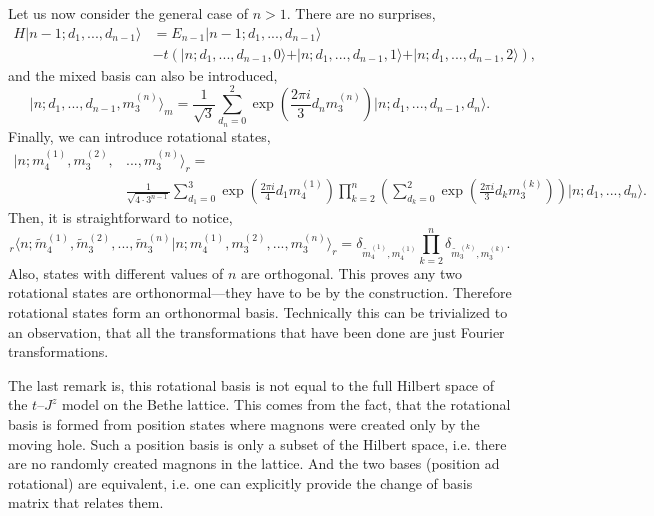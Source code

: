 \documentclass[11pt, a4paper, onecolumn]{article}
\newcommand{\ket}[1]{\vert #1 \rangle}
\newcommand{\mean}[1]{\langle#1\rangle}
\begin{document}
Let us now consider the general case of $n>1$. There are no surprises,
\begin{equation}
\begin{aligned}
	H\ket{n-1;d_1,...,d_{n-1}} &= E_{n-1} \ket{n-1;d_1,...,d_{n-1}} \\
	&- t(\ket{n;d_1,...,d_{n-1},0}+\ket{n;d_1,...,d_{n-1},1}+\ket{n;d_1,...,d_{n-1},2}),
\end{aligned}
\end{equation}
and the mixed basis can also be introduced,
\begin{equation}
	\ket{n;d_1,...,d_{n-1},m^{(n)}_3}_m = \frac{1}{\sqrt{3}}\sum_{d_n=0}^2 \exp\left(\frac{2 \pi i}{3}d_n m^{(n)}_3\right)\ket{n;d_1,...,d_{n-1},d_n}.
\end{equation}
Finally, we can introduce rotational states,
\begin{equation}
\begin{aligned}
	\ket{n;m^{(1)}_4,m^{(2)}_3,&...,m^{(n)}_3}_r = \\
	&\frac{1}{\sqrt{4 \cdot 3^{n-1}}} \sum_{d_1=0}^3 \exp\left(\frac{2 \pi i}{4}d_1 m^{(1)}_4\right) \prod_{k=2}^n \left( \sum_{d_k=0}^2  \exp\left(\frac{2 \pi i}{3}d_k m^{(k)}_3\right) \right) \ket{n;d_1,...,d_n}.
\end{aligned}
\end{equation}
Then, it is straightforward to notice,
\begin{equation}
	_r\mean{
		n;\tilde{m}^{(1)}_4,\tilde{m}^{(2)}_3,...,\tilde{m}^{(n)}_3 
		\vert 
		n;m^{(1)}_4,m^{(2)}_3,...,m^{(n)}_3
	}_r = \delta_{\tilde{m}^{(1)}_4,m^{(1)}_4} \prod_{k=2}^{n} \delta_{\tilde{m}^{(k)}_3,m^{(k)}_3}.
\end{equation}
Also, states with different values of $n$ are orthogonal. This proves any two rotational states are orthonormal---they have to be by the construction. Therefore rotational states form an orthonormal basis. Technically this can be trivialized to an observation, that all the transformations that have been done are just Fourier transformations. 

The last remark is, this rotational basis is not equal to the full Hilbert space of the $t$--$J^z$ model on the Bethe lattice. This comes from the fact, that the rotational basis is formed from position states where magnons were created only by the moving hole. Such a position basis is only a subset of the Hilbert space, i.e. there are no randomly created magnons in the lattice. And the two bases (position ad rotational) are equivalent, i.e. one can explicitly provide the change of basis matrix that relates them.
\end{document}
